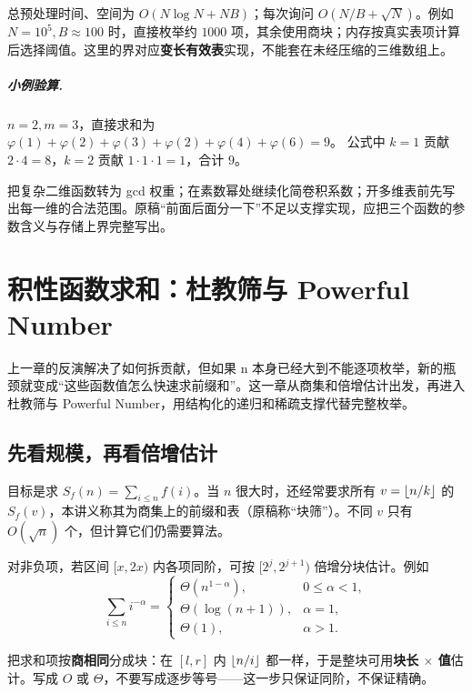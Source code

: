 \cost 总预处理时间、空间为 $O(N\log N+NB)$；每次询问 $O(N/B+\sqrt N)$。例如 $N=10^5,B\approx100$ 时，直接枚举约 $1000$ 项，其余使用商块；内存按真实表项计算后选择阈值。这里的界对应\textbf{变长有效表}实现，不能套在未经压缩的三维数组上。

\paragraph{小例验算.} $n=2,m=3$，直接求和为
$\varphi(1)+\varphi(2)+\varphi(3)+\varphi(2)+\varphi(4)+\varphi(6)=9$。
公式中 $k=1$ 贡献 $2\cdot4=8$，$k=2$ 贡献 $1\cdot1\cdot1=1$，合计 $9$。
\begin{teach}[这道题的三个教学收获]
把复杂二维函数转为 gcd 权重；在素数幂处继续化简卷积系数；开多维表前先写出每一维的合法范围。原稿“前面后面分一下”不足以支撑实现，应把三个函数的参数含义与存储上界完整写出。
\end{teach}



\chapter{积性函数求和：杜教筛与 Powerful Number}
\begin{chapterintro}[章节导读]
上一章的反演解决了如何拆贡献，但如果 n 本身已经大到不能逐项枚举，新的瓶颈就变成“这些函数值怎么快速求前缀和”。这一章从商集和倍增估计出发，再进入杜教筛与 Powerful Number，用结构化的递归和稀疏支撑代替完整枚举。
\end{chapterintro}

\section{先看规模，再看倍增估计}
目标是求 $S_f(n)=\sum_{i\le n}f(i)$。当 $n$ 很大时，还经常要求所有 $v=\left\lfloor n/k\right\rfloor$ 的 $S_f(v)$，本讲义称其为商集上的前缀和表（原稿称“块筛”）。不同 $v$ 只有 $O(\sqrt n)$ 个，但计算它们仍需要算法。

对非负项，若区间 $[x,2x)$ 内各项同阶，可按 $[2^j,2^{j+1})$ 倍增分块估计。例如
\[
 \sum_{i\le n}i^{-\alpha}=
 \begin{cases}
 \Theta(n^{1-\alpha}),&0\le\alpha<1,\\
 \Theta(\log(n+1)),&\alpha=1,\\
 \Theta(1),&\alpha>1.
 \end{cases}
\]

\begin{tip}
把求和项按\textbf{商相同}分成块：在 $[l,r]$ 内 $\left\lfloor n/i\right\rfloor$ 都一样，于是整块可用\textbf{块长 $\times$ 值}估计。写成 $O$ 或 $\Theta$，不要写成逐步等号——这一步只保证同阶，不保证精确。
\end{tip}


